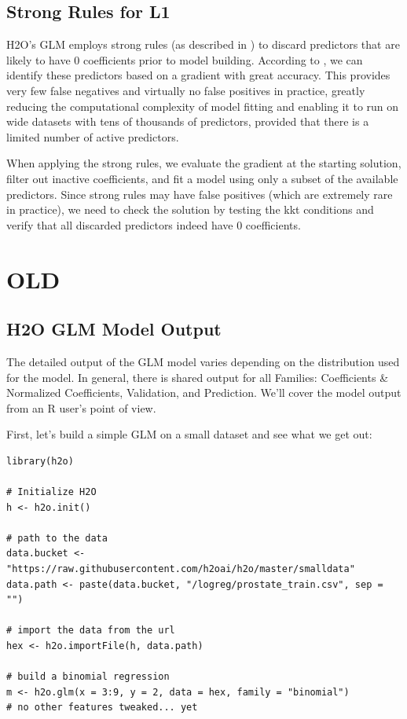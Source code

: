 \subsection{Strong Rules for L1} \label{strongrules}

H2O's GLM employs strong rules (as described in ) to discard predictors that are likely to have
0 coefficients prior to model building. According to , we can identify these predictors based on
a gradient with great accuracy. This provides very few false negatives and virtually no false positives in
practice, greatly reducing the computational complexity of model fitting and enabling it to run on wide datasets
with tens of thousands of predictors, provided that there is a limited number of active predictors.

When applying the strong rules, we evaluate the gradient at the starting solution, filter out inactive
coefficients, and fit a model using only a subset of the available predictors. Since strong rules may have false
positives (which are extremely rare in practice), we need to check the solution by testing the kkt conditions and
verify that all discarded predictors indeed have 0 coefficients.


\section{OLD}

\subsection{H2O GLM Model Output}
The detailed output of the GLM model varies depending on the distribution used for the model. In general, there is
shared output for all Families: Coefficients \& Normalized Coefficients, Validation, and Prediction. We'll cover
the model output from an R user's point of view.

First, let's build a simple GLM on a small dataset and see what we get out:

\begin{lstlisting}[style=R]
library(h2o)

# Initialize H2O
h <- h2o.init()

# path to the data
data.bucket <- "https://raw.githubusercontent.com/h2oai/h2o/master/smalldata"
data.path <- paste(data.bucket, "/logreg/prostate_train.csv", sep = "")

# import the data from the url
hex <- h2o.importFile(h, data.path)

# build a binomial regression
m <- h2o.glm(x = 3:9, y = 2, data = hex, family = "binomial")  
# no other features tweaked... yet
\end{lstlisting}

